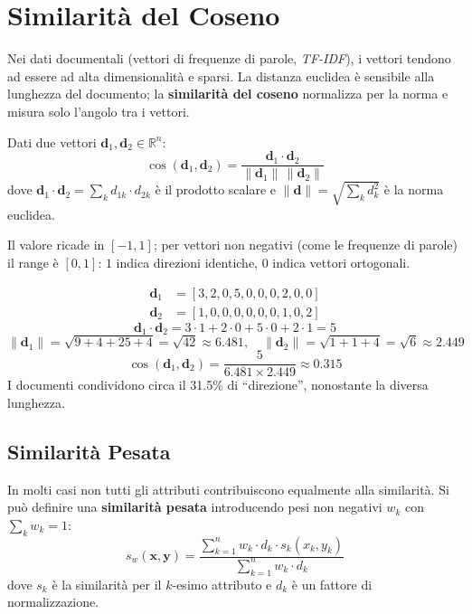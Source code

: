\section{Similarità del Coseno}
\label{sec:cosine}

Nei dati documentali (vettori di frequenze di parole, \textit{TF-IDF}), i vettori tendono ad essere ad alta dimensionalità e sparsi. La distanza euclidea è sensibile alla lunghezza del documento; la \textbf{similarità del coseno} normalizza per la norma e misura solo l'angolo tra i vettori.

\begin{definition}
Dati due vettori $\mathbf{d}_1, \mathbf{d}_2 \in \mathbb{R}^n$:
\begin{equation}
  \cos(\mathbf{d}_1, \mathbf{d}_2) = \frac{\mathbf{d}_1 \cdot \mathbf{d}_2}{\|\mathbf{d}_1\| \, \|\mathbf{d}_2\|}
  \label{eq:cosine}
\end{equation}
dove $\mathbf{d}_1 \cdot \mathbf{d}_2 = \sum_{k} d_{1k} \cdot d_{2k}$ è il prodotto scalare e $\|\mathbf{d}\| = \sqrt{\sum_k d_k^2}$ è la norma euclidea.
\end{definition}

Il valore ricade in $[-1, 1]$; per vettori non negativi (come le frequenze di parole) il range è $[0, 1]$: $1$ indica direzioni identiche, $0$ indica vettori ortogonali.

\begin{example}
\begin{align*}
  \mathbf{d}_1 &= [3, 2, 0, 5, 0, 0, 0, 2, 0, 0] \\
  \mathbf{d}_2 &= [1, 0, 0, 0, 0, 0, 0, 1, 0, 2]
\end{align*}
\[
  \mathbf{d}_1 \cdot \mathbf{d}_2 = 3{\cdot}1 + 2{\cdot}0 + 5{\cdot}0 + 2{\cdot}1 = 5
\]
\[
  \|\mathbf{d}_1\| = \sqrt{9+4+25+4} = \sqrt{42} \approx 6.481, \quad
  \|\mathbf{d}_2\| = \sqrt{1+1+4} = \sqrt{6} \approx 2.449
\]
\[
  \cos(\mathbf{d}_1, \mathbf{d}_2) = \frac{5}{6.481 \times 2.449} \approx 0.315
\]
I documenti condividono circa il 31.5\% di ``direzione'', nonostante la diversa lunghezza.
\end{example}

\subsection{Similarità Pesata}

In molti casi non tutti gli attributi contribuiscono equalmente alla similarità. Si può definire una \textbf{similarità pesata} introducendo pesi non negativi $w_k$ con $\sum_k w_k = 1$:
\begin{equation}
  s_w(\mathbf{x}, \mathbf{y}) = \frac{\sum_{k=1}^{n} w_k \cdot d_k \cdot s_k(x_k, y_k)}{\sum_{k=1}^{n} w_k \cdot d_k}
\end{equation}
dove $s_k$ è la similarità per il $k$-esimo attributo e $d_k$ è un fattore di normalizzazione.


